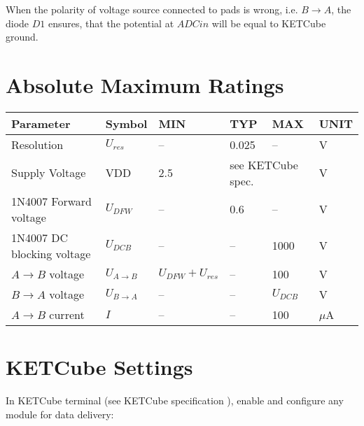 When the polarity of voltage source connected to pads is wrong, i.e. $B \rightarrow A$, the diode $D1$ ensures, that the potential at $ADCin$ will be equal to KETCube ground.

\clearpage
\section{Absolute Maximum Ratings}
  \begin{table*}[!ht]
    \hspace*{-4cm}
    \begin{tabular}{| p{3.5cm} | p{1.5cm} | p{2cm} | p{2cm} | p{2cm} | p{1cm} |}
        \hline
        \rowcolor{SeaGreen3!30!} {\bf Parameter} & {\bf Symbol} & {\bf MIN} & {\bf TYP} & {\bf MAX} & {\bf UNIT} \\
        \hline
        \hline
        Resolution & $U_{res}$ & -- & 0.025 & -- & V\\
        \hline
        \hline
        Supply Voltage & VDD & 2.5\footnotemark & \multicolumn{2}{l|}{see KETCube spec. \cite{ZCU:KETCube:05-2018}} & V \\
        \hline 
        1N4007 Forward voltage & $U_{DFW}$ & -- & 0.6 & -- & V\\
        \hline 
        1N4007 DC blocking voltage & $U_{DCB}$ & -- & -- & 1000 & V\\
        \hline 
        $A \rightarrow B$ voltage & $U_{A \rightarrow B}$ & $U_{DFW} + U_{res}$ & -- & 100 & V\\
        \hline 
        $B \rightarrow A$ voltage & $U_{B \rightarrow A}$ & -- & -- & $U_{DCB}$ & V\\
        \hline 
        $A \rightarrow B$ current & $I$ & -- & -- & 100 & $\mu$A\\
        \hline
    \end{tabular}
    \label{tab:spec:AMR}
   \end{table*}

\clearpage
\section{KETCube Settings}
  In KETCube terminal (see KETCube specification \cite{ZCU:KETCube:05-2018}), enable  and configure any module for data delivery:
  
